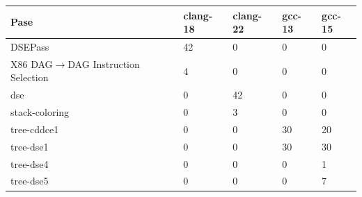 \begin{tabular}{@{}lllll@{}}
\toprule
Pase & clang-18 & clang-22 & gcc-13 & gcc-15 \\
\midrule
DSEPass & 42 & 0 & 0 & 0 \\
X86 DAG$\to$DAG Instruction Selection & 4 & 0 & 0 & 0 \\
dse & 0 & 42 & 0 & 0 \\
stack-coloring & 0 & 3 & 0 & 0 \\
tree-cddce1 & 0 & 0 & 30 & 20 \\
tree-dse1 & 0 & 0 & 30 & 30 \\
tree-dse4 & 0 & 0 & 0 & 1 \\
tree-dse5 & 0 & 0 & 0 & 7 \\
\bottomrule
\end{tabular}
